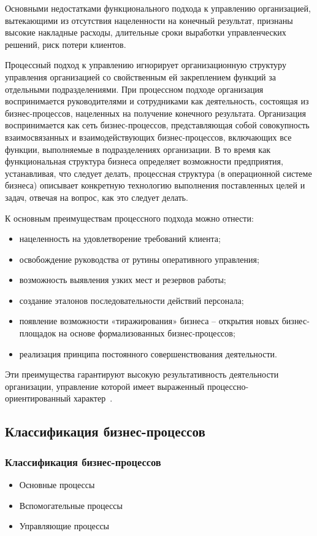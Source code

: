 \documentclass{../industrial-development}
\begin{document}
\lecturenotes

Основными недостатками функционального подхода к управлению организацией, вытекающими из отсутствия нацеленности на конечный результат, признаны высокие накладные расходы, длительные сроки выработки управленческих решений, риск потери клиентов.

Процессный подход к управлению игнорирует организационную структуру управления организацией со свойственным ей закреплением функций за отдельными подразделениями. При процессном подходе организация воспринимается руководителями и сотрудниками как деятельность, состоящая из бизнес-процессов, нацеленных на получение конечного результата. Организация воспринимается как сеть бизнес-процессов, представляющая собой совокупность взаимосвязанных и взаимодействующих бизнес-процессов, включающих все функции, выполняемые в подразделениях организации. В то время как функциональная структура бизнеса определяет возможности предприятия, устанавливая, что следует делать, процессная структура (в операционной системе бизнеса) описывает конкретную технологию выполнения поставленных целей и задач, отвечая на вопрос, как это следует делать.

К основным преимуществам процессного подхода можно отнести:
\begin{itemize}
	\item нацеленность на удовлетворение требований клиента;
	\item освобождение руководства от рутины оперативного управления;
	\item возможность выявления узких мест и резервов работы;
	\item создание эталонов последовательности действий персонала;
	\item появление возможности «тиражирования» бизнеса – открытия новых бизнес-площадок на основе формализованных бизнес-процессов;
	\item реализация принципа постоянного совершенствования деятельности.
\end{itemize}
Эти преимущества гарантируют высокую результативность деятельности организации, управление которой имеет выраженный процессно-ориентированный характер~\cite{Ekon123}.


\subsection{Классификация бизнес-процессов}


\begin{frame} \frametitle{Классификация бизнес-процессов}
	\begin{itemize}
		\item Основные процессы
		\item Вспомогательные процессы
		\item Управляющие процессы
	\end{itemize}
\end{frame}
\end{document}
